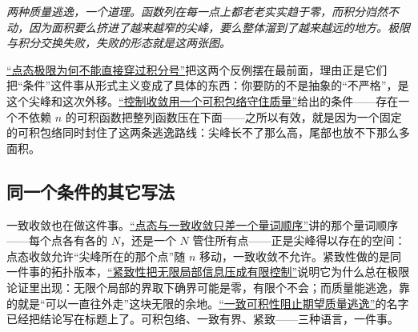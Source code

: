 \begin{center}

\emph{两种质量逃逸，一个道理。函数列在每一点上都老老实实趋于零，而积分岿然不动，因为面积要么挤进了越来越窄的尖峰，要么整体溜到了越来越远的地方。极限与积分交换失败，失败的形态就是这两张图。}
\end{center}

\hyperref[sec:12-Real-Analysis-Support/04-Limits-and-Integration/01]{``点态极限为何不能直接穿过积分号''}把这两个反例摆在最前面，理由正是它们把``条件''这件事从形式主义变成了具体的东西：你要防的不是抽象的``不严格''，是这个尖峰和这次外移。\hyperref[sec:12-Real-Analysis-Support/04-Limits-and-Integration/02]{``控制收敛用一个可积包络守住质量''}给出的条件——存在一个不依赖 \(n\) 的可积函数把整列函数压在下面——之所以有效，就是因为一个固定的可积包络同时封住了这两条逃逸路线：尖峰长不了那么高，尾部也放不下那么多面积。

\subsection{同一个条件的其它写法}

一致收敛也在做这件事。\hyperref[sec:12-Real-Analysis-Support/02-Convergence/02]{``点态与一致收敛只差一个量词顺序''}讲的那个量词顺序——每个点各有各的 \(N\)，还是一个 \(N\) 管住所有点——正是尖峰得以存在的空间：点态收敛允许``尖峰所在的那个点''随 \(n\) 移动，一致收敛不允许。紧致性做的是同一件事的拓扑版本，\hyperref[sec:12-Real-Analysis-Support/03-Topology-Basics/02]{``紧致性把无限局部信息压成有限控制''}说明它为什么总在极限论证里出现：无限个局部的界取下确界可能是零，有限个不会；而质量能逃逸，靠的就是``可以一直往外走''这块无限的余地。\hyperref[sec:12-Real-Analysis-Support/05-Measure-Integration-and-Conditional-Expectation/06]{``一致可积性阻止期望质量逃逸''}的名字已经把结论写在标题上了。可积包络、一致有界、紧致——三种语言，一件事。

